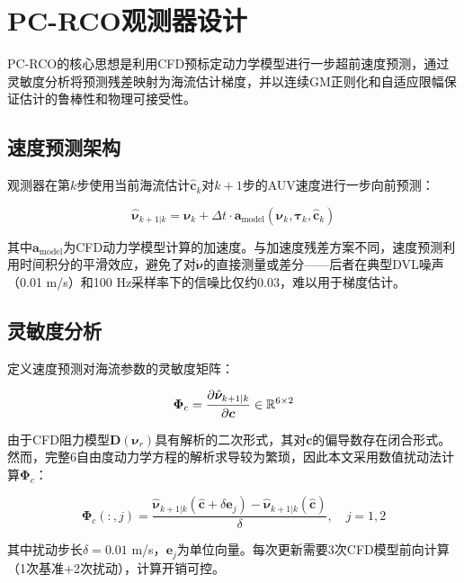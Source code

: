 \section{PC-RCO观测器设计}

PC-RCO的核心思想是利用CFD预标定动力学模型进行一步超前速度预测，通过灵敏度分析将预测残差映射为海流估计梯度，并以连续GM正则化和自适应限幅保证估计的鲁棒性和物理可接受性。

\subsection{速度预测架构}

观测器在第$k$步使用当前海流估计$\hat{\bm{c}}_k$对$k+1$步的AUV速度进行一步向前预测：

\begin{equation}
    \hat{\bm{\nu}}_{k+1|k} = \bm{\nu}_k + \Delta t \cdot \bm{a}_{\text{model}}(\bm{\nu}_k, \bm{\tau}_k, \hat{\bm{c}}_k)
    \label{eq:prediction}
\end{equation}

其中$\bm{a}_{\text{model}}$为CFD动力学模型计算的加速度。与加速度残差方案不同，速度预测利用时间积分的平滑效应，避免了对$\dot{\bm{\nu}}$的直接测量或差分——后者在典型DVL噪声（0.01 m/s）和100 Hz采样率下的信噪比仅约0.03，难以用于梯度估计。

\subsection{灵敏度分析}

定义速度预测对海流参数的灵敏度矩阵：

\begin{equation}
    \bm{\Phi}_c = \frac{\partial \hat{\bm{\nu}}_{k+1|k}}{\partial \bm{c}} \in \mathbb{R}^{6\times 2}
    \label{eq:sensitivity}
\end{equation}

由于CFD阻力模型$\bm{D}(\bm{\nu}_r)$具有解析的二次形式，其对$\bm{c}$的偏导数存在闭合形式。然而，完整6自由度动力学方程的解析求导较为繁琐，因此本文采用数值扰动法计算$\bm{\Phi}_c$：

\begin{equation}
    \bm{\Phi}_c(:,j) = \frac{\hat{\bm{\nu}}_{k+1|k}(\hat{\bm{c}}+\delta\bm{e}_j) - \hat{\bm{\nu}}_{k+1|k}(\hat{\bm{c}})}{\delta}, \quad j=1,2
    \label{eq:numerical_phi}
\end{equation}

其中扰动步长$\delta=0.01$ m/s，$\bm{e}_j$为单位向量。每次更新需要3次CFD模型前向计算（1次基准+2次扰动），计算开销可控。


